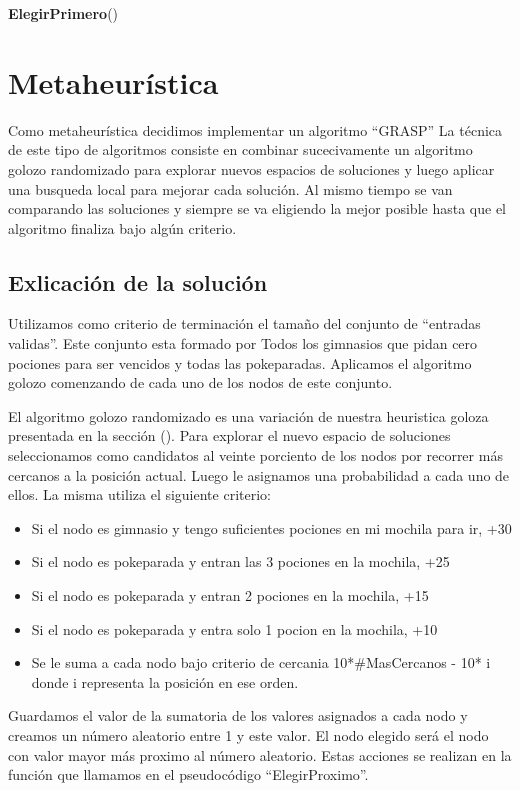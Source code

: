 \documentclass[spanish,12pt]{article}
\begin{document}
\begin{algorithm}[H]{\textbf{ElegirPrimero}()}
\section{Metaheurística}

Como metaheurística decidimos implementar un algoritmo ``GRASP''
La técnica de este tipo de algoritmos consiste en combinar sucecivamente un algoritmo golozo randomizado para explorar nuevos espacios de soluciones y luego aplicar una busqueda local para mejorar cada solución. Al mismo tiempo se van comparando las soluciones y siempre se va eligiendo la mejor posible hasta que el algoritmo finaliza bajo algún criterio.

\subsection{Exlicación de la solución}

Utilizamos como criterio de terminación el tamaño del conjunto de ``entradas validas''. Este conjunto esta formado por Todos los gimnasios que pidan cero pociones para ser vencidos y todas las pokeparadas. Aplicamos el algoritmo golozo comenzando de cada uno de los nodos de este conjunto. 

El algoritmo golozo randomizado es una variación de nuestra heuristica goloza presentada en la sección (). %
Para explorar el nuevo espacio de soluciones seleccionamos como candidatos al veinte porciento de los nodos por recorrer más cercanos a la posición actual.
Luego le asignamos una probabilidad a cada uno de ellos. La misma utiliza el siguiente criterio:

\begin{itemize}
	\item Si el nodo es gimnasio y tengo suficientes pociones en mi mochila para ir, +30
	\item Si el nodo es pokeparada y entran las 3 pociones en la mochila, +25
	\item Si el nodo es pokeparada y entran 2 pociones en la mochila, +15
	\item Si el nodo es pokeparada y entra solo 1 pocion en la mochila, +10
	\item Se le suma a cada nodo  bajo criterio de cercania 10*$\# $MasCercanos - 10* i donde i representa la posición en ese orden.
\end{itemize} 

Guardamos el valor de la sumatoria de los valores asignados a cada nodo  y creamos un número aleatorio entre 1 y este valor. El nodo elegido será el nodo con valor mayor más proximo al número aleatorio. Estas acciones se realizan en la función que llamamos en el pseudocódigo ``ElegirProximo''. 


\end{algorithm}
\end{document}

